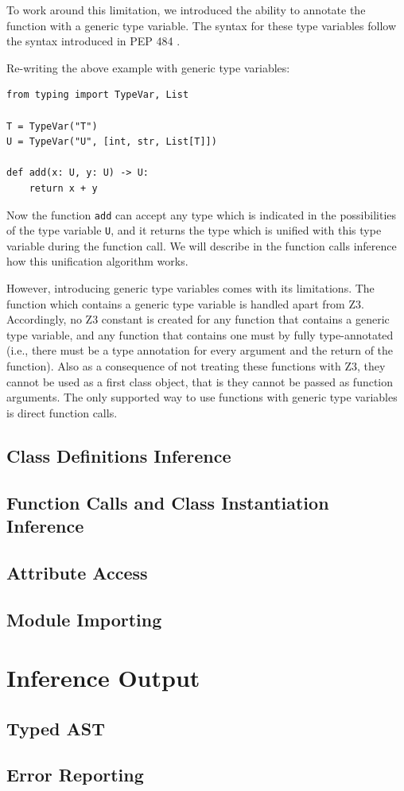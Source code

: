 To work around this limitation, we introduced the ability to annotate the function with a generic type variable. The syntax for these type variables follow the syntax introduced in PEP 484 \cite{484}.

Re-writing the above example with generic type variables:

\begin{lstlisting}
from typing import TypeVar, List

T = TypeVar("T")
U = TypeVar("U", [int, str, List[T]])

def add(x: U, y: U) -> U:
	return x + y
\end{lstlisting}
Now the function \lstinline|add| can accept any type which is indicated in the possibilities of the type variable \lstinline|U|, and it returns the type which is unified with this type variable during the function call. We will describe in the function calls inference how this unification algorithm works.

However, introducing generic type variables comes with its limitations. The function which contains a generic type variable is handled apart from Z3. Accordingly, no Z3 constant is created for any function that contains a generic type variable, and any function that contains one must by fully type-annotated (i.e., there must be a type annotation for every argument and the return of the function). Also as a consequence of not treating these functions with Z3, they cannot be used as a first class object, that is they cannot be passed as function arguments. The only supported way to use functions with generic type variables is direct function calls.
\subsection{Class Definitions Inference}
\subsection{Function Calls and Class Instantiation Inference}
\subsection{Attribute Access}
\subsection{Module Importing}

\section{Inference Output}
\subsection{Typed AST}
\subsection{Error Reporting}